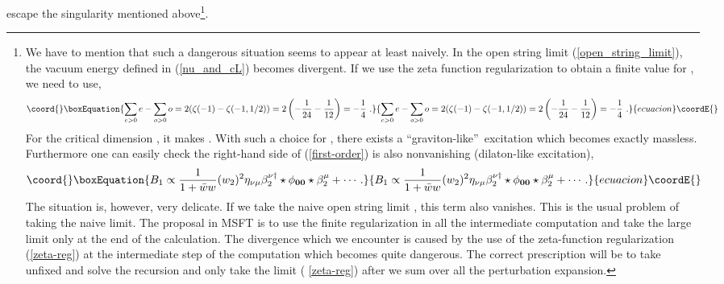\documentclass[a4paper,aps,preprint,nofootinbib,eqsecnum]{revtex4}
\begin{document}
escape the singularity mentioned above\footnote{%
We have to mention that such a dangerous situation seems to appear at least
naively. In the open string limit (\ref{open_string_limit}), the vacuum
energy \myHighlight{$\nu $}\coordHE{} defined in (\ref{nu_and_cL}) becomes divergent. If we use the
zeta function regularization to obtain a finite value for \myHighlight{$\nu $}\coordHE{}, we need to
use,
\begin{equation}\coord{}\boxEquation{
\sum_{e>0}e-\sum_{o>0}o=2(\zeta (-1)-\zeta (-1,1/2))=2\left( -\frac{1}{24}-
\frac{1}{12}\right) =-\frac{1}{4}\,\,.  \label{zeta-reg}
}{
\sum_{e>0}e-\sum_{o>0}o=2(\zeta (-1)-\zeta (-1,1/2))=2\left( -\frac{1}{24}-
\frac{1}{12}\right) =-\frac{1}{4}\,\,.  }{ecuacion}\coordE{}\end{equation}%
For the critical dimension \coordHE{}, it makes \coordHE{}. With such a choice for
\myHighlight{$\nu $}\coordHE{}, there exists a \textquotedblleft graviton-like\textquotedblright\
excitation \myHighlight{$\beta _{2}^{\mu \dagger }\star \phi _{\mathbf{00}}\star \beta
_{2}^{\nu }$}\coordHE{} which becomes exactly massless. Furthermore one can easily
check the right-hand side of (\ref{first-order}) is also nonvanishing
(dilaton-like excitation),
\begin{equation}\coord{}\boxEquation{
B_{1}\propto \frac{1}{1+\bar{w}w}(w_{2})^{2}\eta _{\nu \mu }\beta _{2}^{\nu
\dagger }\star \phi _{\mathbf{00}}\star \beta _{2}^{\mu }+\cdots .
}{
B_{1}\propto \frac{1}{1+\bar{w}w}(w_{2})^{2}\eta _{\nu \mu }\beta _{2}^{\nu
\dagger }\star \phi _{\mathbf{00}}\star \beta _{2}^{\mu }+\cdots .
}{ecuacion}\coordE{}\end{equation}%
The situation is, however, very delicate. If we take the naive open string
limit \myHighlight{$\bar{w}w\rightarrow \infty $}\coordHE{}, this term also vanishes. This is the
usual problem of taking the naive limit. The proposal in MSFT \cite{BM1}\cite%
{BM2}\cite{BKM1} is to use the finite \coordHE{} regularization in all the
intermediate computation and take the large \myHighlight{$N$}\coordHE{} limit only at the end of the
calculation. The divergence which we encounter is caused by the use of the
zeta-function regularization (\ref{zeta-reg}) at the intermediate step of
the computation which becomes quite dangerous. The correct prescription will
be to take \myHighlight{$\nu $}\coordHE{} unfixed and solve the recursion and only take the limit (%
\ref{zeta-reg}) after we sum over all the perturbation expansion.}.
\end{document}
